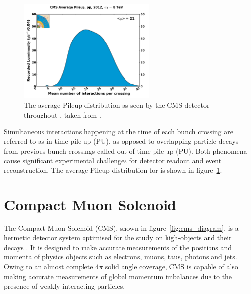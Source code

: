 \begin{figure}
  \centering
  \includegraphics[width=0.6\textwidth]{Figs/machine/pileup_pp_2012.pdf}
  \caption{The average Pileup distribution as seen by the CMS detector
  throughout \runone, taken from \cite{cmslumi}.}
  \label{fig:pileup_runone}
\end{figure}

Simultaneous interactions happening at the time
of each bunch crossing are referred to as in-time pile up (PU), as opposed to 
overlapping particle decays from previous bunch crossings called out-of-time 
pile up (PU). Both phenomena cause significant
experimental challenges for detector readout and event reconstruction.
The average Pileup distribution for \runone is shown in
figure~\ref{fig:pileup_runone}.


\section{Compact Muon Solenoid}  %
\label{sec:detector_overview}

The Compact Muon Solenoid (CMS), shown in figure~\ref{fig:cms_diagram}, is a
hermetic detector system  optimised for the study on high-\Pt objects and their
decays \cite{CMSexperiment}.
It is designed to make accurate measurements of the positions and momenta of
physics objects such as electrons, muons, taus,
photons and jets. Owing to an almost complete 4$\pi$ solid angle coverage, CMS is 
capable of also making accurate measurements of global momentum imbalances due
to the presence of weakly interacting particles.

